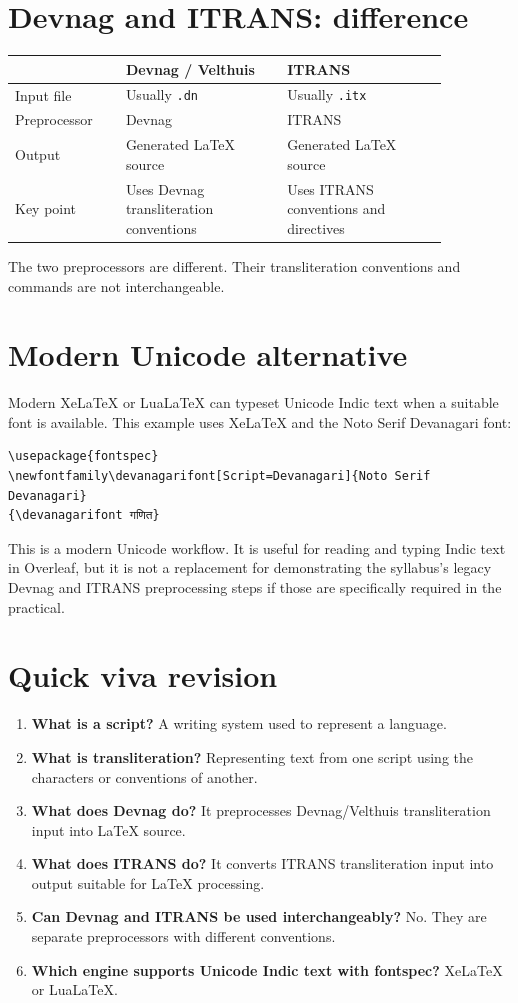 \documentclass[12pt,a4paper]{article}
\begin{document}
\section{Devnag and ITRANS: difference}
\begin{center}
\begin{tabular}{|>{\raggedright\arraybackslash}p{0.22\linewidth}|p{0.32\linewidth}|p{0.32\linewidth}|}
\hline
 & \textbf{Devnag / Velthuis} & \textbf{ITRANS} \\
\hline
Input file & Usually \texttt{.dn} & Usually \texttt{.itx} \\
\hline
Preprocessor & Devnag & ITRANS \\
\hline
Output & Generated LaTeX source & Generated LaTeX source \\
\hline
Key point & Uses Devnag transliteration conventions & Uses ITRANS conventions and directives \\
\hline
\end{tabular}
\end{center}
The two preprocessors are different. Their transliteration conventions and commands are not interchangeable.

\section{Modern Unicode alternative}
Modern XeLaTeX or LuaLaTeX can typeset Unicode Indic text when a suitable font is available. This example uses XeLaTeX and the Noto Serif Devanagari font:
\begin{verbatim}
\usepackage{fontspec}
\newfontfamily\devanagarifont[Script=Devanagari]{Noto Serif Devanagari}
{\devanagarifont गणित}
\end{verbatim}

\noindent This is a modern Unicode workflow. It is useful for reading and typing Indic text in Overleaf, but it is not a replacement for demonstrating the syllabus's legacy Devnag and ITRANS preprocessing steps if those are specifically required in the practical.

\section{Quick viva revision}
\begin{enumerate}
  \item \textbf{What is a script?} A writing system used to represent a language.
  \item \textbf{What is transliteration?} Representing text from one script using the characters or conventions of another.
  \item \textbf{What does Devnag do?} It preprocesses Devnag/Velthuis transliteration input into LaTeX source.
  \item \textbf{What does ITRANS do?} It converts ITRANS transliteration input into output suitable for LaTeX processing.
  \item \textbf{Can Devnag and ITRANS be used interchangeably?} No. They are separate preprocessors with different conventions.
  \item \textbf{Which engine supports Unicode Indic text with fontspec?} XeLaTeX or LuaLaTeX.
\end{enumerate}
\end{document}
